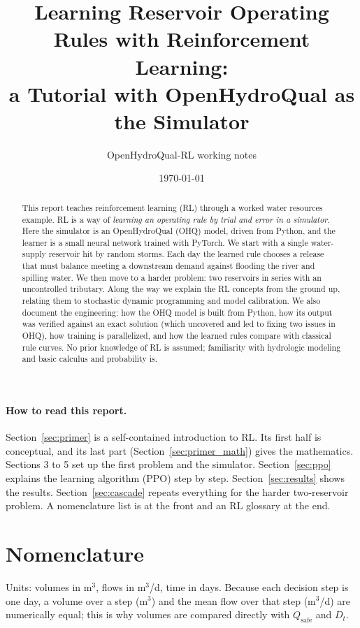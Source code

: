\documentclass[11pt]{article}
\title{Learning Reservoir Operating Rules with Reinforcement Learning:\\
       a Tutorial with OpenHydroQual as the Simulator}
\author{OpenHydroQual-RL working notes}
\date{\today}
\newcommand{\Qsafe}{Q_{\mathrm{safe}}}
\begin{document}
\maketitle

\begin{abstract}
This report teaches reinforcement learning (RL) through a worked water
resources example. RL is a way of \emph{learning an operating rule by
trial and error in a simulator}. Here the simulator is an OpenHydroQual
(OHQ) model, driven from Python, and the learner is a small neural network
trained with PyTorch. We start with a single water-supply reservoir hit by
random storms. Each day the learned rule chooses a release that must
balance meeting a downstream demand against flooding the river and
spilling water. We then move to a harder problem: two reservoirs in series
with an uncontrolled tributary. Along the way we explain the RL concepts
from the ground up, relating them to stochastic dynamic programming and
model calibration. We also document the engineering: how the OHQ model is
built from Python, how its output was verified against an exact solution
(which uncovered and led to fixing two issues in OHQ), how training is
parallelized, and how the learned rules compare with classical rule
curves. No prior knowledge of RL is assumed; familiarity with hydrologic
modeling and basic calculus and probability is.
\end{abstract}

\paragraph{How to read this report.} Section~\ref{sec:primer} is a
self-contained introduction to RL. Its first half is conceptual, and its
last part (Section~\ref{sec:primer_math}) gives the mathematics. Sections 3
to 5 set up the first problem and the simulator. Section~\ref{sec:ppo}
explains the learning algorithm (PPO) step by step. Section~\ref{sec:results}
shows the results. Section~\ref{sec:cascade} repeats everything for the
harder two-reservoir problem. A nomenclature list is at the front and an RL
glossary at the end.

\tableofcontents
\newpage

\section*{Nomenclature}
Units: volumes in m$^3$, flows in m$^3$/d, time in days. Because each
decision step is one day, a volume over a step (m$^3$) and the mean flow
over that step (m$^3$/d) are numerically equal; this is why volumes are
compared directly with $\Qsafe$ and $D_t$.
\end{document}
